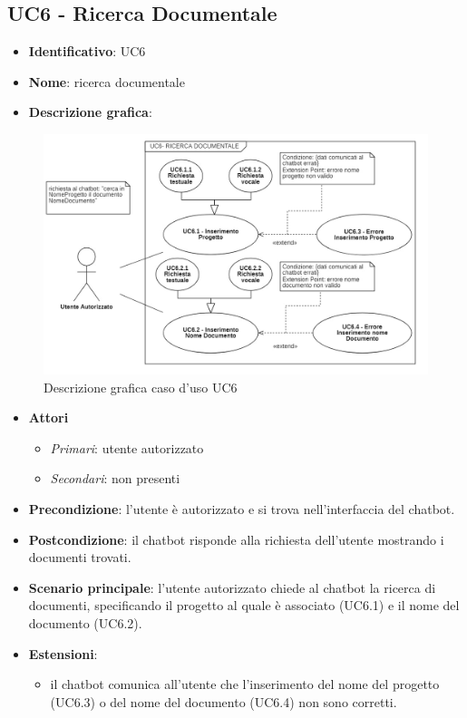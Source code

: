 \subsection{UC6 - Ricerca Documentale}
\begin{itemize}
    \item \textbf{Identificativo}: UC6
    \item \textbf{Nome}: ricerca documentale
    \item \textbf{Descrizione grafica}:
\end{itemize}

\begin{figure}[h]
   \centering
   \includegraphics[scale=2]{images/UC6.png} 
   \caption{Descrizione grafica caso d'uso UC6}
\end{figure}

 \begin{itemize}
    \item \textbf{Attori}
 \begin{itemize} 
    \item \textit{Primari}: utente autorizzato
    \item \textit{Secondari}: non presenti
 \end{itemize}
 \item \textbf{Precondizione}: l'utente è autorizzato e si trova nell'interfaccia del chatbot.
 \item \textbf{Postcondizione}: il chatbot risponde alla richiesta dell'utente mostrando i documenti trovati.
 \item \textbf{Scenario principale}: l'utente autorizzato chiede al chatbot la ricerca di documenti, specificando il progetto al quale è associato (UC6.1) e il nome del documento (UC6.2).
 \item \textbf{Estensioni}: 
 \begin{itemize} 
    \item il chatbot comunica all'utente che l'inserimento del nome del progetto (UC6.3) o del nome del documento (UC6.4) non sono corretti.
 \end{itemize}
\end{itemize}
\newpage
